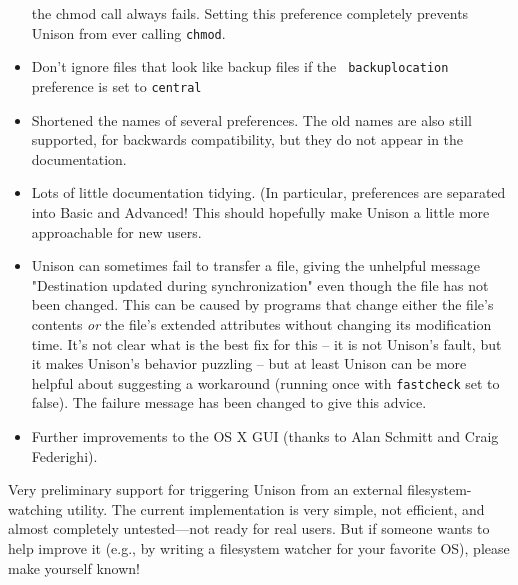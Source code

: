 \begin{changesfromversion}{2.27}
\begin{itemize}
the chmod call always fails.  Setting this preference completely prevents
Unison from ever calling {\tt chmod}.
\item Don't ignore files that look like backup files if the {\tt
  backuplocation} preference is set to {\tt central}
\item Shortened the names of several preferences.  The old names are also
still supported, for backwards compatibility, but they do not appear in the
documentation.
\item Lots of little documentation tidying.  (In particular, preferences are
separated into Basic and Advanced!  This should hopefully make Unison a
little more approachable for new users.
\item Unison can sometimes fail to transfer a file, giving the unhelpful
message "Destination updated during synchronization" even though the file
has not been changed.  This can be caused by programs that change either the
file's contents \emph{or} the file's extended attributes without changing
its modification time.  It's not clear what is the best fix for this -- it
is not Unison's fault, but it makes Unison's behavior puzzling -- but at
least Unison can be more helpful about suggesting a workaround (running once
with {\tt fastcheck} set to false).  The failure message has been changed to
give this advice.
\item Further improvements to the OS X GUI (thanks to Alan Schmitt and Craig
Federighi).
\end{itemize}
\item Very preliminary support for triggering Unison from an external
  filesystem-watching utility.  The current implementation is very
  simple, not efficient, and almost completely untested---not ready
  for real users.  But if someone wants to help improve it (e.g.,
  by writing a filesystem watcher for your favorite OS), please make
  yourself known!


\end{changesfromversion}
